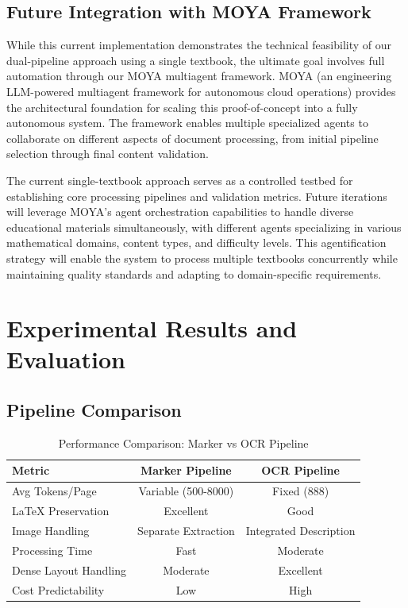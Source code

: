 \documentclass[12pt]{article}
\begin{document}
\subsection{Future Integration with MOYA Framework}

While this current implementation demonstrates the technical feasibility of our dual-pipeline approach using a single textbook, the ultimate goal involves full automation through our MOYA multiagent framework. MOYA (an engineering LLM-powered multiagent framework for autonomous cloud operations) \cite{moya2025} provides the architectural foundation for scaling this proof-of-concept into a fully autonomous system. The framework enables multiple specialized agents to collaborate on different aspects of document processing, from initial pipeline selection through final content validation.

The current single-textbook approach serves as a controlled testbed for establishing core processing pipelines and validation metrics. Future iterations will leverage MOYA's agent orchestration capabilities to handle diverse educational materials simultaneously, with different agents specializing in various mathematical domains, content types, and difficulty levels. This agentification strategy will enable the system to process multiple textbooks concurrently while maintaining quality standards and adapting to domain-specific requirements.

\section{Experimental Results and Evaluation}

\subsection{Pipeline Comparison}

\begin{table}[htbp]
\centering
\caption{Performance Comparison: Marker vs OCR Pipeline}
\begin{tabular}{@{}lcc@{}}
\toprule
\textbf{Metric} & \textbf{Marker Pipeline} & \textbf{OCR Pipeline} \\
\midrule
Avg Tokens/Page & Variable (500-8000) & Fixed (888) \\
LaTeX Preservation & Excellent & Good \\
Image Handling & Separate Extraction & Integrated Description \\
Processing Time & Fast & Moderate \\
Dense Layout Handling & Moderate & Excellent \\
Cost Predictability & Low & High \\
\bottomrule
\end{tabular}
\end{table}
\end{document}
